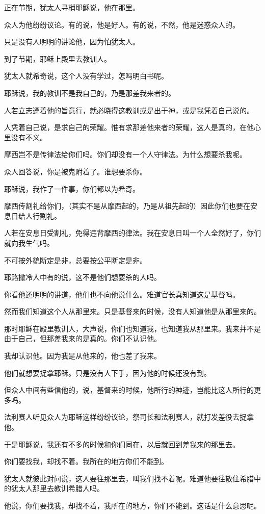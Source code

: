 \documentclass[12pt,oneside]{book}
\begin{document}
正在节期，犹太人寻梢耶稣说，他在那里。

众人为他纷纷议论。有的说，他是好人。有的说，不然，他是迷惑众人的。

只是没有人明明的讲论他，因为怕犹太人。

到了节期，耶稣上殿里去教训人。

犹太人就希奇说，这个人没有学过，怎吗明白书呢。

耶稣说，我的教训不是我自己的，乃是那差我来者的。

人若立志遵着他的旨意行，就必晓得这教训或是出于神，或是我凭着自己说的。

人凭着自己说，是求自己的荣耀。惟有求那差他来者的荣耀，这人是真的，在他心里没有不义。

摩西岂不是传律法给你们吗。你们却没有一个人守律法。为什么想要杀我呢。

众人回答说，你是被鬼附着了。谁想要杀你。

耶稣说，我作了一件事，你们都以为希奇。

摩西传割礼给你们，（其实不是从摩西起的，乃是从祖先起的）因此你们也要在安息日给人行割礼。

人若在安息日受割礼，免得违背摩西的律法。我在安息日叫一个人全然好了，你们就向我生气吗。

不可按外貌断定是非，总要按公平断定是非。

耶路撒冷人中有的说，这不是他们想要杀的人吗。

你看他还明明的讲道，他们也不向他说什么。难道官长真知道这是基督吗。

然而我们知道这个人从那里来。只是基督来的时候，没有人知道他是从那里来的。

那时耶稣在殿里教训人，大声说，你们也知道我，也知道我从那里来。我来并不是由于自己，但那差我来的是真的。你们不认识他。

我却认识他。因为我是从他来的，他也差了我来。

他们就想要捉拿耶稣。只是没有人下手，因为他的时候还没有到。

但众人中间有些信他的，说，基督来的时候，他所行的神迹，岂能比这人所行的更多吗。

法利赛人听见众人为耶稣这样纷纷议论，祭司长和法利赛人，就打发差役去捉拿他。

于是耶稣说，我还有不多的时候和你们同在，以后就回到差我来的那里去。

你们要找我，却找不着。我所在的地方你们不能到。

犹太人就彼此对问说，这人要往那里去，叫我们找不着呢。难道他要往散住希腊中的犹太人那里去教训希腊人吗。

他说，你们要找我，却找不着，我所在的地方，你们不能到。这话是什么意思呢。
\end{document}
